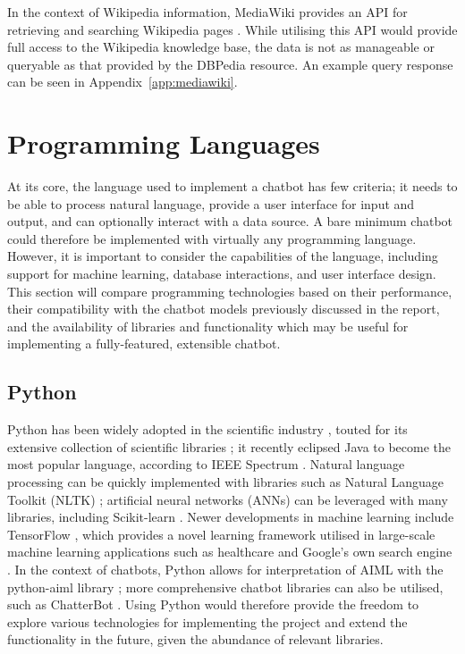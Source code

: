 In the context of Wikipedia information, MediaWiki provides an API for retrieving and searching Wikipedia pages \cite{mediawiki}. While utilising this API would provide full access to the Wikipedia knowledge base, the data is not as manageable or queryable as that provided by the DBPedia resource. An example query response can be seen in Appendix~\ref{app:mediawiki}.

\newpage
\section{Programming Languages}
At its core, the language used to implement a chatbot has few criteria; it needs to be able to process natural language, provide a user interface for input and output, and can optionally interact with a data source. A bare minimum chatbot could therefore be implemented with virtually any programming language. However, it is important to consider the capabilities of the language, including support for machine learning, database interactions, and user interface design. This section will compare programming technologies based on their performance, their compatibility with the chatbot models previously discussed in the report, and the availability of libraries and functionality which may be useful for implementing a fully-featured, extensible chatbot.
 
\subsection{Python}
Python has been widely adopted in the scientific industry \cite{bird2009natural}, touted for its extensive collection of scientific libraries \cite{koepke2011python}; it recently eclipsed Java to become the most popular language, according to IEEE Spectrum \cite{cass2019}. Natural language processing can be quickly implemented with libraries such as Natural Language Toolkit (NLTK) \cite{nltk2019}; artificial neural networks (ANNs) can be leveraged with many libraries, including Scikit-learn \cite{pedregosa2011scikit}. Newer developments in machine learning include TensorFlow \cite{abadi2016tensorflow}, which provides a novel learning framework utilised in large-scale machine learning applications such as healthcare \cite{polzin2019} and Google’s own search engine \cite{pichai2015}. In the context of chatbots, Python allows for interpretation of AIML with the python-aiml library \cite{villegas2019}; more comprehensive chatbot libraries can also be utilised, such as ChatterBot \cite{cox2019}. Using Python would therefore provide the freedom to explore various technologies for implementing the project and extend the functionality in the future, given the abundance of relevant libraries.

